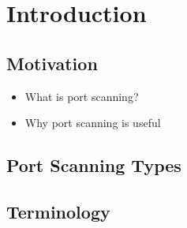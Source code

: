 \section{Introduction}\label{Introduction}

\subsection{Motivation}\label{Motivation}

\begin{itemize}
	\item{What is port scanning?}
	\item{Why port scanning is useful}
\end{itemize}

\subsection{Port Scanning Types}\label{PortScanningTypes}

\subsection{Terminology}\label{Terminology}